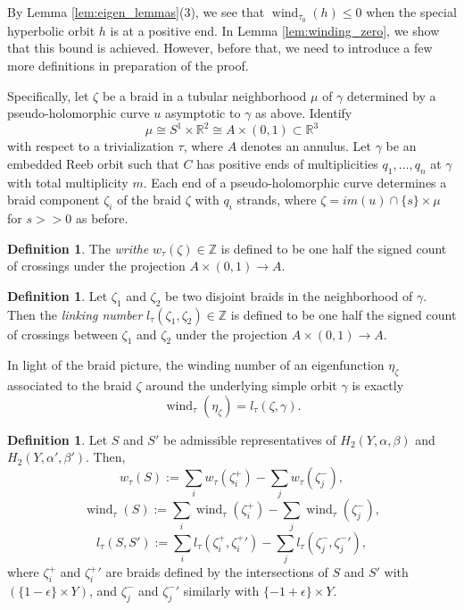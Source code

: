 \documentclass{article}
\numberwithin{equation}{section}
\theoremstyle{definition}
\newtheorem{definition}[theorem]{Definition}
\newcommand{\wind}{\operatorname{wind}}
\begin{document}
By Lemma \ref{lem:eigen_lemmas}(3), we see that $\wind_{\tau_0} (h) \leq 0$ when the special hyperbolic orbit $h$ is at a positive end. In Lemma \ref{lem:winding_zero}, we show that this bound is achieved. However, before that, we need to introduce a few more definitions in preparation of the proof. 


Specifically, let $\zeta$ be a braid in a tubular neighborhood $\mu$ of $\gamma$ determined by a pseudo-holomorphic curve $u$ asymptotic to $\gamma$ as above. Identify 
$$\mu \cong S^1 \times \mathbb{R}^2 \cong A\times (0,1)\subset \mathbb{R}^3$$ 
with respect to a trivialization $\tau$, where $A$ denotes an annulus. Let $\gamma$ be an embedded Reeb orbit such that $C$ has positive ends of multiplicities $q_1, \dots, q_n$ at $\gamma$ with total multiplicity $m$. Each end of a pseudo-holomorphic curve determines a braid component $\zeta_i$ of the braid $\zeta$ with $q_i$ strands, where $\zeta = im(u) \cap \{s\} \times \mu$ for $s>>0$ as before.

\begin{definition}
\label{lem:braid_writhe_bound}
The \emph{writhe} $w_\tau(\zeta)\in \mathbb{Z}$ is defined to be one half the signed count of crossings under the projection $A\times (0,1) \to A$.
\end{definition}




\begin{definition}
Let $\zeta_1$ and $\zeta_2$ be two disjoint braids in the neighborhood of $\gamma$. Then the \emph{linking number} $l_\tau(\zeta_1, \zeta_2)\in \mathbb{Z}$ is defined to be one half the signed count of crossings between $\zeta_1$ and $\zeta_2$ under the projection $A\times (0,1) \to A$.
\end{definition}

In light of the braid picture, the winding number of an eigenfunction $\eta_\zeta$ associated to the braid $\zeta$ around the underlying simple orbit $\gamma$ is exactly 
$$\wind_\tau(\eta_\zeta) = l_\tau(\zeta, \gamma).$$

\begin{definition}
\label{def:linking_surfaces}
Let $S$ and $S'$ be admissible representatives of $H_2(Y, \alpha, \beta)$ and $H_2(Y, \alpha', \beta')$. Then,
$$w_\tau(S):= \sum_i w_\tau(\zeta_i^+) - \sum_j w_\tau(\zeta_j^-),$$
$$\wind_\tau(S):= \sum_i \wind_\tau(\zeta_i^+) - \sum_j \wind_\tau(\zeta_j^-),$$
$$l_\tau(S,S'):= \sum_i l_\tau(\zeta_{i}^{+}, \zeta_{i}^{+}{}') - \sum_j l_\tau(\zeta_j^-, \zeta_j^{-}{}'),$$
where $\zeta_i^+$ and $\zeta_i^{+}{}'$ are braids defined by the intersections of $S$ and $S'$ with $(\{1-\epsilon\} \times Y)$, and $\zeta_j^-$ and $\zeta_j^{-}{}'$ similarly with $\{-1+\epsilon\} \times Y$.
\end{definition}
\end{document}
